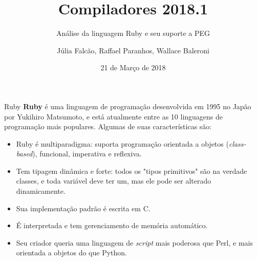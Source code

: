 \documentclass{beamer}
\title{Compiladores 2018.1}
\subtitle{Análise da linguagem Ruby e seu suporte a PEG}
\author[Abrev.]{Júlia Falcão, Raffael Paranhos, Wallace Baleroni}
\institute[UFF]{Universidade Federal Fluminense}
\date{21 de Março de 2018}
\begin{document}

\begin{frame}[plain]

\titlepage

\end{frame}


\begin{frame}[fragile]{Ruby}
\textbf{Ruby} é uma linguagem de programação desenvolvida em 1995 no Japão por Yukihiro Matsumoto, e está atualmente entre as 10 linguagens de programação mais populares. Algumas de suas características são:

\begin{itemize}

\item Ruby é multiparadigma: suporta programação orientada a objetos (\textit{class-based}), funcional, imperativa e reflexiva.

\item Tem tipagem dinâmica e forte: todos os "tipos primitivos" são na verdade classes, e toda variável deve ter um, mas ele pode ser alterado dinamicamente.

\item Sua implementação padrão é escrita em C.

\item É interpretada e tem gerenciamento de memória automático.

\item Seu criador queria uma linguagem de \textit{script} mais poderosa que Perl, e mais orientada a objetos do que Python.

\end{itemize}

\end{frame}
\end{document}
